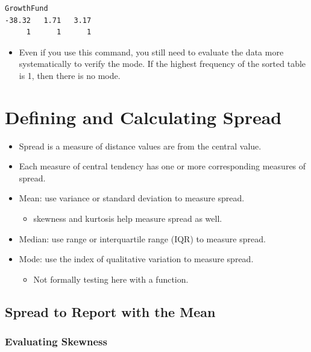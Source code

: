 \documentclass[
  letterpaper,
  DIV=11,
  numbers=noendperiod]{scrreprt}
\providecommand{\tightlist}{%
  \setlength{\itemsep}{0pt}\setlength{\parskip}{0pt}}\usepackage{longtable,booktabs,array}
\begin{document}
\begin{verbatim}
GrowthFund
-38.32   1.71   3.17 
     1      1      1 
\end{verbatim}

\begin{itemize}
\tightlist
\item
  Even if you use this command, you still need to evaluate the data more
  systematically to verify the mode. If the highest frequency of the
  sorted table is 1, then there is no mode.
\end{itemize}


\chapter{Defining and Calculating
Spread}\label{defining-and-calculating-spread}

\begin{itemize}
\tightlist
\item
  Spread is a measure of distance values are from the central value.
\item
  Each measure of central tendency has one or more corresponding
  measures of spread.
\item
  Mean: use variance or standard deviation to measure spread.

  \begin{itemize}
  \tightlist
  \item
    skewness and kurtosis help measure spread as well.
  \end{itemize}
\item
  Median: use range or interquartile range (IQR) to measure spread.
\item
  Mode: use the index of qualitative variation to measure spread.

  \begin{itemize}
  \tightlist
  \item
    Not formally testing here with a function.
  \end{itemize}
\end{itemize}

\section{Spread to Report with the
Mean}\label{spread-to-report-with-the-mean}

\subsection{Evaluating Skewness}\label{evaluating-skewness}
\end{document}
